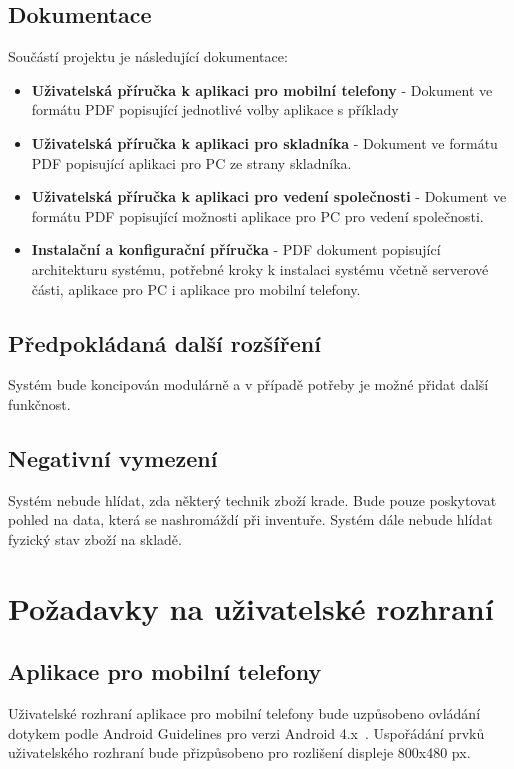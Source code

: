 \documentclass[a4paper,10pt]{article}
\begin{document}
\subsection{Dokumentace}
Součástí projektu je následující dokumentace:
\begin{itemize}
	\item \textbf{Uživatelská příručka k aplikaci pro mobilní telefony} - Dokument ve formátu PDF popisující jednotlivé volby aplikace s příklady
	\item \textbf{Uživatelská příručka k aplikaci pro skladníka} - Dokument ve formátu PDF popisující aplikaci pro PC ze strany skladníka. 
	\item \textbf{Uživatelská příručka k aplikaci pro vedení společnosti} - Dokument ve formátu PDF popisující možnosti aplikace pro PC pro vedení společnosti.
	\item \textbf{Instalační a konfigurační příručka} - PDF dokument popisující architekturu systému, potřebné kroky k instalaci systému včetně serverové části, aplikace pro PC i aplikace pro mobilní telefony.
\end{itemize}

\subsection{Předpokládaná další rozšíření}
Systém bude koncipován modulárně a v případě potřeby je možné přidat další funkčnost.

\subsection{Negativní vymezení}
Systém nebude hlídat, zda některý technik zboží krade. Bude pouze poskytovat pohled na data, která se nashromáždí při inventuře. Systém dále nebude hlídat fyzický stav zboží na skladě.

\section{Požadavky na uživatelské rozhraní}
\subsection{Aplikace pro mobilní telefony}
Uživatelské rozhraní aplikace pro mobilní telefony bude uzpůsobeno ovládání dotykem podle Android Guidelines pro verzi Android 4.x~\cite{android_guidelines}. Uspořádání prvků uživatelského rozhraní bude přizpůsobeno pro rozlišení displeje 800x480 px.
\end{document}
